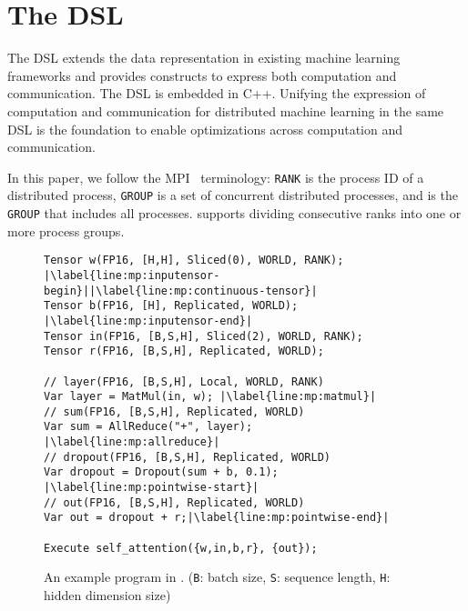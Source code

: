 \section{The \tool DSL}
\label{sec:dsl}
The \tool DSL extends the data representation in existing machine learning frameworks and provides constructs to express both computation and communication. 
The \tool DSL is embedded in C++.
Unifying the expression of computation and communication for distributed machine learning in the same DSL is the foundation to enable optimizations across computation and communication.

In this paper, we follow the MPI~\cite{mpi} terminology: \texttt{RANK} is the process ID of a distributed process, \texttt{GROUP} is a set of concurrent distributed processes, and \WORLD is the \texttt{GROUP} that includes all processes.
\tool supports dividing consecutive ranks into one or more process groups.

\begin{figure}[t]
  \footnotesize
  \begin{lstlisting}[language=DSL]
Tensor w(FP16, [H,H], Sliced(0), WORLD, RANK); |\label{line:mp:inputensor-begin}||\label{line:mp:continuous-tensor}|
Tensor b(FP16, [H], Replicated, WORLD); |\label{line:mp:inputensor-end}| 
Tensor in(FP16, [B,S,H], Sliced(2), WORLD, RANK);
Tensor r(FP16, [B,S,H], Replicated, WORLD);

// layer(FP16, [B,S,H], Local, WORLD, RANK)
Var layer = MatMul(in, w); |\label{line:mp:matmul}|
// sum(FP16, [B,S,H], Replicated, WORLD)
Var sum = AllReduce("+", layer); |\label{line:mp:allreduce}|
// dropout(FP16, [B,S,H], Replicated, WORLD)
Var dropout = Dropout(sum + b, 0.1); |\label{line:mp:pointwise-start}|
// out(FP16, [B,S,H], Replicated, WORLD)
Var out = dropout + r;|\label{line:mp:pointwise-end}|

Execute self_attention({w,in,b,r}, {out});
\end{lstlisting}
	\caption{An example program in \tool. \newline
		(\texttt{B}: batch size, \texttt{S}: sequence length, \texttt{H}: hidden dimension size)
	}
  \vspace{-2em}
    \label{fig:traditional-mp}
\end{figure}

